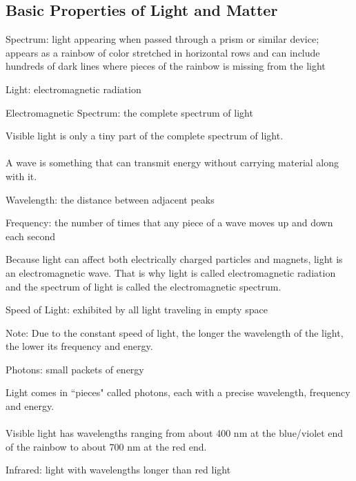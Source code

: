 \documentclass[12pt]{article}
\begin{document}
\subsection{Basic Properties of Light and Matter} 
\begin{definition} Spectrum: light appearing when passed through a prism or similar device; appears as a rainbow of color stretched in horizontal rows and can include hundreds of dark lines where pieces of the rainbow is missing from the light \end{definition}
\begin{definition} Light: electromagnetic radiation \end{definition}
\begin{definition} Electromagnetic Spectrum: the complete spectrum of light \end{definition}
Visible light is only a tiny part of the complete spectrum of light. \\~\\
A wave is something that can transmit energy without carrying material along with it. 
\begin{definition} Wavelength: the distance between adjacent peaks \end{definition}
\begin{definition} Frequency: the number of times that any piece of a wave moves up and down each second \end{definition}
Because light can affect both electrically charged particles and magnets, light is an electromagnetic wave. That is why light is called electromagnetic radiation and the spectrum of light is called the electromagnetic spectrum. 
\begin{definition} Speed of Light: exhibited by all light traveling in empty space \end{definition}
Note: Due to the constant speed of light, the longer the wavelength of the light, the lower its frequency and energy. 
\begin{definition} Photons: small packets of energy \end{definition}
Light comes in ``pieces" called photons, each with a precise wavelength, frequency and energy. \\~\\
Visible light has wavelengths ranging from about 400 nm at the blue/violet end of the rainbow to about 700 nm at the red end. 
\begin{definition} Infrared: light with wavelengths longer than red light \end{definition}
\end{document}
